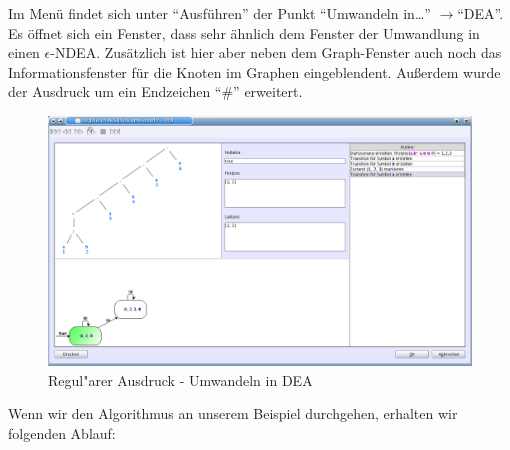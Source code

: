 Im Menü findet sich unter "`Ausführen"' der Punkt "`Umwandeln in\ldots"' $\rightarrow$"`DEA"'. Es öffnet sich ein Fenster, dass sehr ähnlich dem Fenster der Umwandlung in einen $\epsilon$-NDEA. Zusätzlich ist hier aber neben dem Graph-Fenster auch noch das Informationsfenster für die Knoten im Graphen eingeblendent. Außerdem wurde der Ausdruck um ein Endzeichen "`\#"' erweitert.

\begin{figure}[h]
\begin{center}
\includegraphics[width=12cm]{../images/regex_to_dfa.png}
\caption{Regul"arer Ausdruck - Umwandeln in DEA}
\end{center}
\end{figure}

Wenn wir den Algorithmus an unserem Beispiel durchgehen, erhalten wir folgenden Ablauf:

